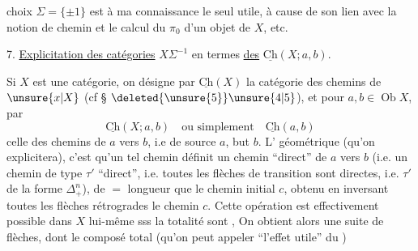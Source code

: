 

choix $\Sigma=\{\pm1\}$ est  à ma connaissance le seul utile, à cause de son lien avec la notion de chemin et le calcul du $\pi_0$ d'un objet de $X$, etc.

7. \uline{Explicitation des catégories}  $X\Sigma^{-1}$ en termes \uline{des} $\underline{\mathrm{Ch}}(X;a,b)$.

Si $X$ est une catégorie, on désigne par $\underline{\mathrm{Ch}}(X)$ la catégorie des chemins de $\unsure{x|X}$ (cf \S{} $\deleted{\unsure{5}}\unsure{4|5}$), et pour $a,b\in\operatorname{Ob}X$, par
\[
\underline{\mathrm{Ch}}(X;a,b)\quad\text{ou simplement}\quad\underline{\mathrm{Ch}}(a,b)
\]
celle des chemins de $a$ vers $b$, i.e de source $a$, but $b$. L' géométrique (qu'on explicitera), c'est qu'un tel chemin  définit un chemin ``direct'' de $a$ vers $b$ (i.e. un chemin de type $\tau'$  ``direct'', i.e.  toutes les flèches de transition sont directes, i.e. $\tau'$ de la forme $\Delta_+^n$), de $=$ longueur que le chemin initial $c$, obtenu en inversant toutes les flèches rétrogrades  le chemin $c$. Cette opération est effectivement possible dans $X$ lui-même sss la totalité  sont , On obtient alors une suite  de flèches, dont le composé total  (qu'on peut appeler ``l'effet utile'' du )
